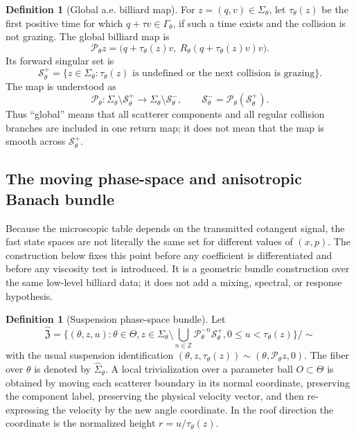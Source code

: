 \documentclass[12pt, letterpaper]{amsart}
\newcommand{\Pcal}{\mathcal{P}}
\newcommand{\Z}{\mathbb{Z}}
\newcommand{\Thetacal}{\Theta}
\theoremstyle{plain}
\theoremstyle{definition}
\newtheorem{definition}[theorem]{Definition}
\theoremstyle{remark}
\begin{document}
\begin{definition}[Global a.e. billiard map]
\label{def:global_billiard_map_singular}
For $z=(q,v)\in\Sigma_\theta$, let $\tau_\theta(z)$ be the first positive time for which $q+\tau v\in\Gamma_\theta$, if such a time exists and the collision is not grazing.  The global billiard map is
\begin{equation}
    \Pcal_\theta z=\bigl(q+\tau_\theta(z)v,\ R_\theta(q+\tau_\theta(z)v)v\bigr).
\end{equation}
Its forward singular set is
\begin{equation}
    \mathcal S^+_\theta
    =\{z\in\Sigma_\theta:\tau_\theta(z)\text{ is undefined or the next collision is grazing}\}.
\end{equation}
The map is understood as
\begin{equation}
    \Pcal_\theta: \Sigma_\theta\setminus\mathcal S^+_\theta
       \longrightarrow \Sigma_\theta\setminus\mathcal S^-_\theta,
    \qquad \mathcal S^-_\theta=\Pcal_\theta(\mathcal S^+_\theta).
\end{equation}
Thus ``global'' means that all scatterer components and all regular collision branches are included in one return map; it does not mean that the map is smooth across $\mathcal S^+_\theta$.
\end{definition}



\subsection{The moving phase-space and anisotropic Banach bundle}
\label{subsec:phase_banach_bundle}

Because the microscopic table depends on the transmitted cotangent signal, the
fast state spaces are not literally the same set for different values of
$(x,p)$.  The construction below fixes this point before any coefficient is
differentiated and before any viscosity test is introduced.  It is a geometric
bundle construction over the same low-level billiard data; it does not add a
mixing, spectral, or response hypothesis.

\begin{definition}[Suspension phase-space bundle]
\label{def:phase_space_bundle}
Let
\begin{equation}
    \widehat{\mathfrak Z}
    =\{(\theta,z,u):\theta\in\Thetacal,
        z\in\Sigma_\theta\setminus\bigcup_{n\in\Z}\Pcal_\theta^{-n}\mathcal S_\theta^+,
        0\le u<\tau_\theta(z)\}/\sim
\end{equation}
with the usual suspension identification
$(\theta,z,\tau_\theta(z))\sim(\theta,\Pcal_\theta z,0)$.  The fiber over
$\theta$ is denoted by $\widehat\Sigma_\theta$.  A local trivialization over a
parameter ball $O\subset\Thetacal$ is obtained by moving each scatterer boundary
in its normal coordinate, preserving the component label, preserving the
physical velocity vector, and then re-expressing the velocity by the new angle
coordinate.  In the roof direction the coordinate is the normalized height
$r=u/\tau_\theta(z)$.
\end{definition}
\end{document}
